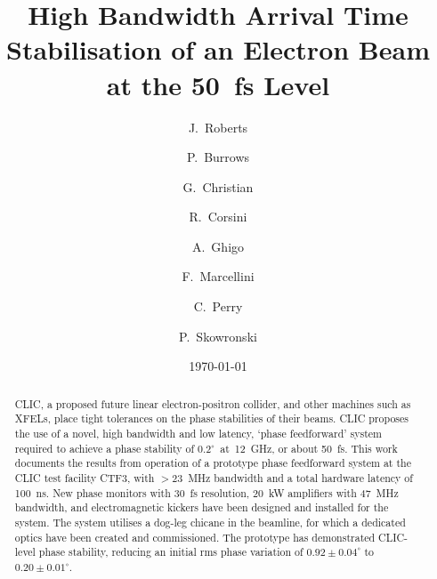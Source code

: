 \documentclass[%
 reprint,
superscriptaddress,
 amsmath,amssymb,
 prl,
]{revtex4-1}
\begin{document}

\title{High Bandwidth Arrival Time Stabilisation of an Electron Beam at 
the 50~fs Level}

\author{J.~Roberts}

\author{P.~Burrows}

\author{G.~Christian}

\author{R.~Corsini}

\author{A.~Ghigo}

\author{F.~Marcellini}

\author{C.~Perry}

\author{P.~Skowronski}

\date{\today}

\begin{abstract}
CLIC, a proposed future linear electron-positron collider, and other machines 
such as XFELs, place tight tolerances on the phase stabilities of their beams. 
CLIC proposes the use of a novel, high bandwidth and low latency, `phase 
feedforward' system required to achieve a phase stability of 
\(0.2^\circ\)~at~12~GHz, or about 50~fs. This work documents the results from 
operation of a prototype phase feedforward system at the CLIC test facility 
CTF3, with \(>23\)~MHz bandwidth and a total hardware latency of 100~ns. New 
phase monitors with 30~fs resolution, 20~kW amplifiers with 47~MHz bandwidth, 
and electromagnetic kickers have been designed and installed for the system. 
The system utilises a dog-leg chicane in the beamline, for which a dedicated 
optics have been created and commissioned. The prototype has demonstrated 
CLIC-level phase stability, reducing an initial rms phase variation of 
\(0.92\pm0.04^\circ\) to \(0.20\pm0.01^\circ\).
\end{abstract}

\maketitle
\end{document}
